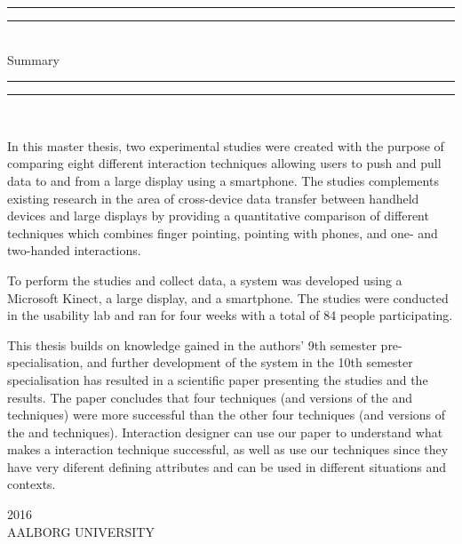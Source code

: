 \begin{dummy}

	\textheight
	\centering
	\vspace*{\baselineskip}
	\rule{\textwidth}{2pt}\vspace*{-\baselineskip}\vspace*{2pt}
	\rule{\textwidth}{0.4pt}\\[\baselineskip]
	{\LARGE Summary}\\[0.2\baselineskip]
	\rule{\textwidth}{0.4pt}\vspace*{-\baselineskip}\vspace{3.2pt}
	\rule{\textwidth}{2pt}\\[\baselineskip]
	\scshape
	{} \par
	\vspace*{0.7\baselineskip}

\begin{summary}
In this master thesis, two experimental studies were created with the purpose of comparing eight different interaction techniques allowing users to push and pull data to and from a large display using a smartphone.
The studies complements existing research in the area of cross-device data transfer between handheld devices and large displays by providing a quantitative comparison of different techniques which combines finger pointing, pointing with phones, and one- and two-handed interactions.

To perform the studies and collect data, a system was developed using a Microsoft Kinect, a large display, and a smartphone.
The studies were conducted in the usability lab and ran for four weeks with a total of 84 people participating. 

This thesis builds on knowledge gained in the authors' 9th semester pre-specialisation, and further development of the system in the 10th semester specialisation has resulted in a scientific paper presenting the studies and the results.
The paper concludes that four techniques (\pull and \push versions of the \swipe and \throw techniques) were more successful than the other four techniques (\pull and \push versions of the \grab and \tilt techniques).
Interaction designer can use our paper to understand what makes a interaction technique successful, as well as use our techniques since they have very diferent defining attributes and can be used in different situations and contexts. 
\end{summary}
	\vspace*{2\baselineskip}
		{\scshape 2016} \\
		{\large AALBORG UNIVERSITY}\par
	
\end{dummy}